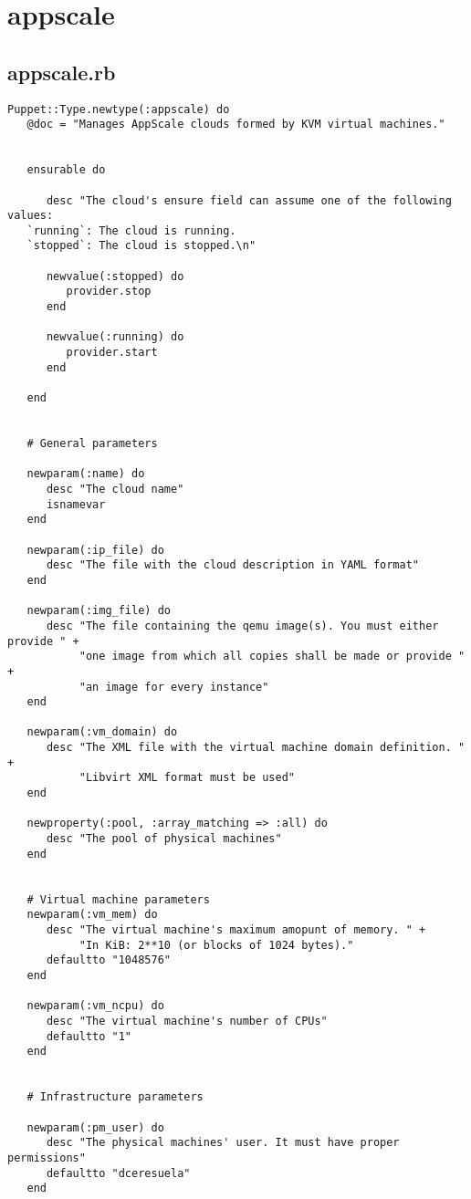 \section{appscale}
\subsection{appscale.rb}


\begin{lstlisting}
Puppet::Type.newtype(:appscale) do
   @doc = "Manages AppScale clouds formed by KVM virtual machines."

   
   ensurable do

      desc "The cloud's ensure field can assume one of the following values:
   `running`: The cloud is running.
   `stopped`: The cloud is stopped.\n"
   
      newvalue(:stopped) do
         provider.stop
      end

      newvalue(:running) do
         provider.start
      end

   end


   # General parameters
   
   newparam(:name) do
      desc "The cloud name"
      isnamevar
   end

   newparam(:ip_file) do
      desc "The file with the cloud description in YAML format"
   end

   newparam(:img_file) do
      desc "The file containing the qemu image(s). You must either provide " +
           "one image from which all copies shall be made or provide " +
           "an image for every instance"
   end

   newparam(:vm_domain) do
      desc "The XML file with the virtual machine domain definition. " +
           "Libvirt XML format must be used"
   end

   newproperty(:pool, :array_matching => :all) do
      desc "The pool of physical machines"
   end

   
   # Virtual machine parameters
   newparam(:vm_mem) do
      desc "The virtual machine's maximum amopunt of memory. " + 
           "In KiB: 2**10 (or blocks of 1024 bytes)."
      defaultto "1048576"
   end
   
   newparam(:vm_ncpu) do
      desc "The virtual machine's number of CPUs"
      defaultto "1"
   end
   
   
   # Infrastructure parameters

   newparam(:pm_user) do
      desc "The physical machines' user. It must have proper permissions"
      defaultto "dceresuela"
   end


\end{lstlisting}
